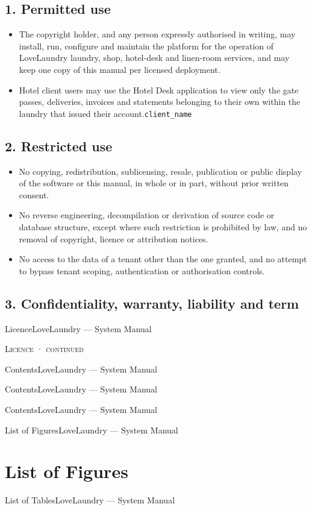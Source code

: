 \documentclass[11pt,a4paper,oneside]{book}
\begin{document}
\subsection*{1. Permitted use}
\begin{itemize}
\item The copyright holder, and any person expressly authorised in writing, may install, run, configure and maintain the platform for the operation of LoveLaundry laundry, shop, hotel-desk and linen-room services, and may keep one copy of this manual per licensed deployment.
\item Hotel client users may use the Hotel Desk application to view only the gate passes, deliveries, invoices and statements belonging to their own  within the laundry that issued their account.\texttt{client\_name}
\end{itemize}
\subsection*{2. Restricted use}
\begin{itemize}
\item No copying, redistribution, sublicensing, resale, publication or public display of the software or this manual, in whole or in part, without prior written consent.
\item No reverse engineering, decompilation or derivation of source code or database structure, except where such restriction is prohibited by law, and no removal of copyright, licence or attribution notices.
\item No access to the data of a tenant other than the one granted, and no attempt to bypass tenant scoping, authentication or authorisation controls.
\end{itemize}
\subsection*{3. Confidentiality, warranty, liability and term}
LicenceLoveLaundry — System Manual

\textsc{\small\color{crimson}Licence · continued}\par\medskip
ContentsLoveLaundry — System Manual

ContentsLoveLaundry — System Manual

ContentsLoveLaundry — System Manual

List of FiguresLoveLaundry — System Manual

\section*{List of Figures}
List of TablesLoveLaundry — System Manual
\end{document}
